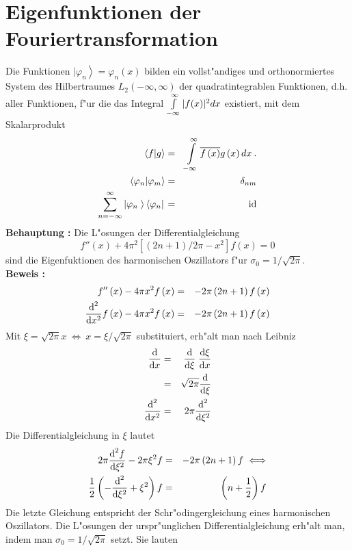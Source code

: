 \documentclass[11pt,twoside]{report}
\begin{document}
\section{Eigenfunktionen der Fouriertransformation}
Die Funktionen $|\varphi_n\left.\right> =\varphi_n\left(x\right) $ bilden ein vollst"andiges und orthonormiertes System des Hilbertraumes $L_2\left(-\infty ,\infty\right)$ der quadratintegrablen Funktionen, d.h. aller Funktionen, f"ur die das Integral $\int\limits_{-\infty}^{\infty}|f(x)|^2dx$ existiert, mit dem Skalarprodukt
\begin{eqnarray*}
\left<f|g\right> & = & \int\limits_{-\infty}^{\infty} \overline{f\left( x\right)} g\left( x\right) dx \: . \\
\left<\varphi_n | \varphi_m \right> & = & \delta_{nm} \\
\sum_{n=-\infty}^{\infty}|\varphi_n\left. \right>\left<\varphi_n|\right. & = & \mbox{id} 
\end{eqnarray*}
{\bf Behauptung :} Die L"osungen der Differentialgleichung
$$f''\left( x\right) + 4\pi ^2\left[ \left(2n + 1\right)/2 \pi - x^2\right] f\left( x\right) = 0$$
sind die Eigenfuktionen des harmonischen Oszillators f"ur $\sigma_0 = 1/\sqrt{2\pi}$. \\
{\bf Beweis : } 
\begin{eqnarray*}
  f''\left( x \right) - 4\pi x^2 f\left( x \right) & = & -2\pi \left( 2n + 1\right)  f\left( x \right) \\
  {\mbox{d}^2 \over \mbox{d} x^2}f\left( x \right) - 4\pi x^2 f\left( x \right) & = & -2\pi \left( 2n + 1 \right) f\left( x \right) 
\end{eqnarray*}
Mit $\xi = \sqrt{2\pi}x \: \Longleftrightarrow \: x=\xi/\sqrt{2\pi}$ substituiert, erh"alt man nach Leibniz 
\begin{eqnarray*}
  {\mbox{d}\over \mbox{d}x} & = & {\mbox{d} \over \mbox{d} \xi} \; {\mbox{d} \xi \over \mbox{d} x} \\
                    & = & \sqrt{2\pi} {\mbox{d} \over \mbox{d} \xi} \\
  {\mbox{d}^2 \over \mbox{d} x^2} & = & 2\pi {\mbox{d}^2 \over \mbox{d}\xi^2} 
\end{eqnarray*}
Die Differentialgleichung in $\xi$ lautet
\begin{eqnarray*}
  2\pi {\mbox{d}^2 f \over \mbox{d}\xi^2} - 2\pi \xi^2 f & = & -2\pi \left( 2n + 1\right) f \; \Longleftrightarrow \\
 \frac{1}{2} \left( -{\mbox{d}^2 \over \mbox{d} \xi^2} +  \xi^2 \right) f & = & \left( n + \frac{1}{2} \right) f 
\end{eqnarray*}
Die letzte Gleichung entspricht der Schr"odingergleichung eines harmonischen Oszillators. Die L"osungen der urspr"unglichen Differentialgleichung erh"alt man, indem man $\sigma_0 = 1/\sqrt{2\pi}$ setzt. Sie lauten
\end{document}
